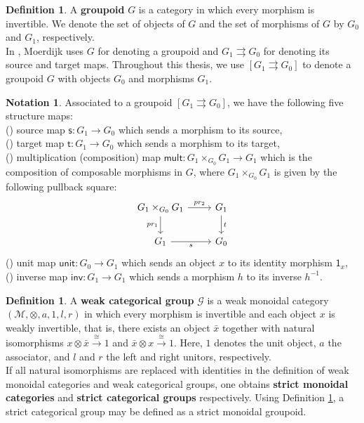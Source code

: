 \documentclass{article}
\theoremstyle{plain}
\theoremstyle{definition}
\newtheorem{defn}[thm]{Definition}
\newtheorem{nota}[thm]{Notation}
\newcommand{\rNum}[1]{\lowercase\expandafter{\romannumeral #1\relax}}
\begin{document}
\begin{defn}\cite{MR116360}\cite[Section 1.1 on page 206]{MR1950948}\label{groupoid1}
A \textbf{groupoid} $G$ is a category in which every morphism is invertible. We denote the set of objects of $G$ and the set of morphisms of $G$ by $G_0$ and $G_1$, respectively. \\ In \cite{MR1950948}, Moerdijk uses $G$ for denoting a groupoid and $G_1 \rightrightarrows G_0$ for denoting its source and target maps. Throughout this thesis, we use $[G_1 \rightrightarrows G_0]$ to denote a groupoid $G$ with objects $G_0$ and morphisms $G_1$.
\end{defn}
\begin{nota}\label{groupoid}
\cite[Section 1.1 on page 206]{MR1950948} Associated to a groupoid $[G_1 \rightrightarrows G_0]$, we have the following five structure maps: \\
(\rNum{1}) source map $\mathsf{s}:G_1 \longrightarrow G_0$ which sends a morphism to its source, \\
(\rNum{2}) target map $\mathsf{t}:G_1 \longrightarrow G_0$ which sends a morphism to its target, \\
(\rNum{3}) multiplication (composition) map $\mathsf{mult}:G_1 \times_{G_0} G_1 \longrightarrow G_1$ which is the composition of composable morphisms in $G$, where $G_1 \times_{G_0} G_1$ is given by the following pullback square:
\[
\begin{tikzcd}
G_1 \times_{G_0} G_1 \arrow[r,"pr_2"] \arrow[d,"pr_1"'] & G_1 \arrow[d,"t"] \\
G_1 \arrow[r,"s"'] & G_0
\end{tikzcd}
\]
(\rNum{4}) unit map $\mathsf{unit}:G_0 \longrightarrow G_1$ which sends an object $x$ to its identity morphism $\mathsf{1}_x$, \\
(\rNum{5}) inverse map $\mathsf{inv}:G_1 \longrightarrow G_1$ which sends a morphism $h$ to its inverse $h^{-1}$.
\end{nota}
\begin{defn}\cite{MR217087}\cite[Definition 2.2 on page 429]{MR2068521}
A \textbf{weak categorical group} $\mathcal{G}$ is a weak monoidal category $(\mathcal{M},\otimes,a,1,l,r)$ in which every morphism is invertible and each object $x$ is weakly invertible, that is, there exists an object $\bar{x}$ together with natural isomorphisms $x \otimes \bar{x} \overset{\cong}\longrightarrow 1$ and $\bar{x} \otimes x \overset{\cong}\longrightarrow 1$. Here, $1$ denotes the unit object, $a$ the associator, and $l$ and $r$ the left and right unitors, respectively. \\
If all natural isomorphisms are replaced with identities in the definition of weak monoidal categories and weak categorical groups, one obtains \textbf{strict monoidal categories} and \textbf{strict categorical groups} respectively. Using Definition \ref{groupoid1}, a strict categorical group may be defined as a strict monoidal groupoid. 
\end{defn}
\end{document}
